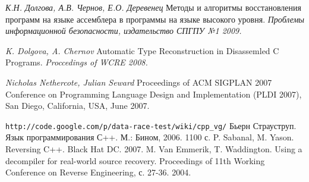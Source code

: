 \documentclass[a4paper,12pt,russian]{article}
\begin{document}
\clearpage

\newpage
{}
\begin{thebibliography}{9}
     \emph{К.Н. Долгова, А.В. Чернов, Е.О. Деревенец} Методы и алгоритмы восстановления программ на языке ассемблера в программы на языке высокого уровня. \textit{Проблемы информационной безопасности, издательство СПГПУ №1 2009.}

     \emph{K. Dolgova, A. Chernov} Automatic Type Reconstruction in Disassemled C Programs. \textit{Proccedings of WCRE 2008.}

     \emph{Nicholas Nethercote, Julian Seward} Proceedings of ACM SIGPLAN 2007 Conference on Programming Language Design and Implementation (PLDI 2007), San Diego, California, USA, June 2007.

     \texttt{http://code.google.com/p/data-race-test/wiki/cpp\_vg/}
     Бьерн Страуструп. Язык программирования С++. М.: Бином, 2006. 1100 с.
    P. Sabanal, M. Yason. Reversing C++. Black Hat DC. 2007.
     M. Van Emmerik, T. Waddington. Using a decompiler for real-world source recovery. Proceedings of 11th Working Conference on Reverse Engineering, с. 27-36. 2004.
\end{thebibliography}
\end{document}
